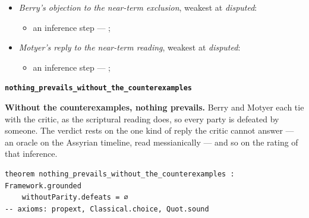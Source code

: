 \documentclass[11pt]{article}
\begin{document}
\begin{itemize}
\begin{itemize}
\item Mary conceived Jesus while a virgin --- Matt 1:18-25; Luke 1:26-38; \cite[30--33]{brown-problem-virginal-conception-1972}
\item an inference step --- \cite[ad loc. Isa 7:14]{motyer-isaiah-1993}
\item an inference step --- \cite{miravalle-meet-your-mother-2014}
\item an inference step --- \cite{miravalle-introduction-mary-2020}
\item an inference step --- \cite[490--493]{postell-isaiah-messianic-2025}
\item an inference step --- \cite[ad loc. Matt 1:23]{france-matthew-2007}
\end{itemize}
\item \emph{Berry’s objection to the near-term exclusion}, weakest at \emph{disputed}:
\begin{itemize}
\item an inference step --- \cite[1653--1654]{berry-virgin-birth-2003}; \cite[5]{compton-immanuel-prophecy-2007}
\end{itemize}
\item \emph{Motyer’s reply to the near-term reading}, weakest at \emph{disputed}:
\begin{itemize}
\item an inference step --- \cite[124]{motyer-context-content-1970}; \cite[5]{compton-immanuel-prophecy-2007}
\end{itemize}
\end{itemize}
\par\medskip\noindent\textbf{\texttt{nothing\_\allowbreak{}prevails\_\allowbreak{}without\_\allowbreak{}the\_\allowbreak{}counterexamples}}\par\nobreak\noindent
\textbf{Without the counterexamples, nothing prevails.} Berry and Motyer each tie with the critic, as the scriptural reading does, so every party is defeated by someone. The verdict rests on the one kind of reply the critic cannot answer — an oracle on the Assyrian timeline, read messianically — and so on the rating of that inference.

{\small\begin{verbatim}
theorem nothing_prevails_without_the_counterexamples : Framework.grounded
    withoutParity.defeats = ∅
-- axioms: propext, Classical.choice, Quot.sound
\end{verbatim}}
\end{document}
